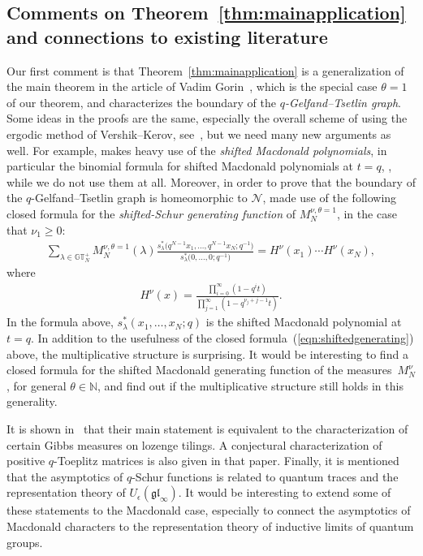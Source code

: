 \documentclass[pdftex]{sigma}
\numberwithin{equation}{section}
\newcommand{\N}{\mathbb{N}}
\newcommand{\Nu}{\mathcal{N}}
\newcommand{\GTp}{\mathbb{GT}^+}
\begin{document}
\subsection{Comments on Theorem~\ref{thm:mainapplication} and connections to existing literature}

Our f\/irst comment is that Theorem~\ref{thm:mainapplication} is a generalization of the main theorem in the article of Vadim Gorin~\cite{G}, which is the special case $\theta = 1$ of our theorem, and characterizes the boundary of the \textit{$q$-Gelfand--Tsetlin graph}. Some ideas in the proofs are the same, especially the overall scheme of using the ergodic method of Vershik--Kerov, see~\cite{VK}, but we need many new arguments as well. For example, \cite{G} makes heavy use of the \textit{shifted Macdonald polynomials}, in particular the binomial formula for shifted Macdonald polynomials at $t = q$, \cite{Ok0}, while we do not use them at all. Moreover, in order to prove that the boundary of the $q$-Gelfand--Tsetlin graph is homeomorphic to $\Nu$, \cite{G} made use of the following closed formula for the \textit{shifted-Schur generating function} of $M_N^{\nu, \theta = 1}$, in the case that $\nu_1 \geq 0$:
\begin{gather}\label{eqn:shiftedgenerating}
\sum_{\lambda\in\GTp_N}{M_N^{\nu, \theta = 1}(\lambda)\frac{s_{\lambda}^*\big(q^{N-1}x_1, \dots, q^{N-1}x_N; q^{-1}\big)}{s_{\lambda}^*\big(0, \dots, 0; q^{-1}\big)}} = H^{\nu}(x_1)\cdots H^{\nu}(x_N),
\end{gather}
where
\begin{gather*}
H^{\nu}(x) = \frac{\prod\limits_{i=0}^{\infty}{(1 - q^i t)}}{\prod\limits_{j=1}^{\infty}{(1 - q^{\nu_j + j - 1}t)}}.
\end{gather*}
In the formula above, $s_{\lambda}^*(x_1, \dots, x_N; q)$ is the shifted Macdonald polynomial at $t = q$. In addition to the usefulness of the closed formula~(\ref{eqn:shiftedgenerating}) above, the multiplicative structure is surprising. It would be interesting to f\/ind a closed formula for the shifted Macdonald generating function of the measures~$M_N^{\nu}$, for general $\theta\in\N$, and f\/ind out if the multiplicative structure still holds in this generality.

It is shown in~\cite{G} that their main statement is equivalent to the characterization of certain Gibbs measures on lozenge tilings. A conjectural characterization of positive $q$-Toeplitz matrices is also given in that paper. Finally, it is mentioned that the asymptotics of $q$-Schur functions is related to quantum traces and the representation theory of $U_{\epsilon}(\mathfrak{gl}_{\infty})$. It would be interesting to extend some of these statements to the Macdonald case, especially to connect the asymptotics of Macdonald characters to the representation theory of inductive limits of quantum groups.
\end{document}

